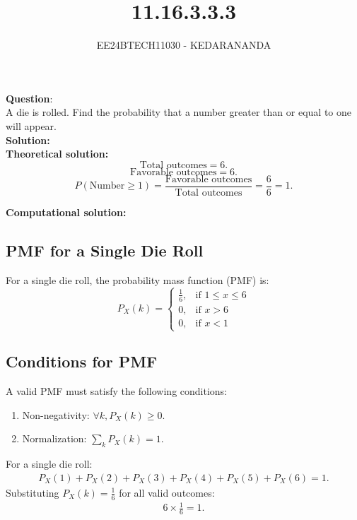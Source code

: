 \documentclass[journal]{IEEEtran}
\begin{document}
	
	
	\vspace{3cm}
	
	\title{11.16.3.3.3}
	\author{EE24BTECH11030 - KEDARANANDA }
	{\let\newpage\relax\maketitle}
	
	\renewcommand{\thefigure}{\theenumi}
	\renewcommand{\thetable}{\theenumi}
	\setlength{\intextsep}{10pt} %
	
	
	\renewcommand{\thetable}{\theenumi}
	
	
	\textbf{Question}:\\
	A die is rolled. Find the probability that a number greater than or equal to one will appear.\\
	\textbf{Solution: }\\
	\textbf{Theoretical solution: }\\
	\[
	\text{Total outcomes} = 6.
	\]
	\[
	\text{Favorable outcomes} = 6.
	\]
	\[
	P(\text{Number} \geq 1) = \frac{\text{Favorable outcomes}}{\text{Total outcomes}} = \frac{6}{6} = 1.
	\]
	
	\textbf{Computational solution: }\\
	\subsection*{PMF for a Single Die Roll}
	For a single die roll, the probability mass function (PMF) is:
	\[
	P_X(k) =
	\begin{cases}
		\frac{1}{6}, & \text{if } 1 \leq x \leq 6\\
		0, & \text{if } x > 6\\
		0, & \text{if } x < 1
	\end{cases}
	\]
	
	\subsection*{Conditions for PMF}
	A valid PMF must satisfy the following conditions:
	\begin{enumerate}
		\item Non-negativity: \(\forall k, P_X(k) \geq 0\).
		\item Normalization: \(\sum_{k} P_X(k) = 1\).
	\end{enumerate}
	For a single die roll:
	\begin{align}
		P_X(1) + P_X(2) + P_X(3) + P_X(4) + P_X(5) + P_X(6) = 1.
	\end{align}
	Substituting \(P_X(k) = \frac{1}{6}\) for all valid outcomes:
	\begin{align}
		6 \times \frac{1}{6} = 1.
	\end{align}
	
\end{document}
